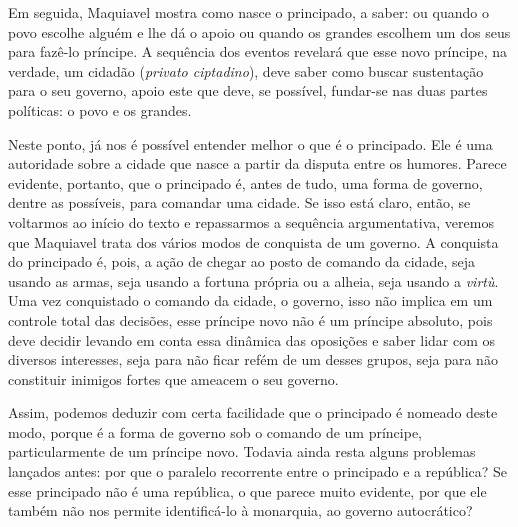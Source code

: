 Em seguida, Maquiavel mostra como nasce o principado, a saber: ou quando
o povo escolhe alguém e lhe dá o apoio ou quando os grandes escolhem um
dos seus para fazê-lo príncipe. A sequência dos eventos revelará que
esse novo príncipe, na verdade, um cidadão (\emph{privato ciptadino}),
deve saber como buscar sustentação para o seu governo, apoio este que
deve, se possível, fundar-se nas duas partes políticas: o povo e os
grandes.

Neste ponto, já nos é possível entender melhor o que é o principado. Ele
é uma autoridade sobre a cidade que nasce a partir da disputa entre os
humores. Parece evidente, portanto, que o principado é, antes de tudo,
uma forma de governo, dentre as possíveis, para comandar uma cidade. Se
isso está claro, então, se voltarmos ao início do texto e repassarmos a
sequência argumentativa, veremos que Maquiavel trata dos vários modos de
conquista de um governo. A conquista do principado é, pois, a ação de
chegar ao posto de comando da cidade, seja usando as armas, seja usando
a fortuna própria ou a alheia, seja usando a \emph{virtù}. Uma vez
conquistado o comando da cidade, o governo, isso não implica em um
controle total das decisões, esse príncipe novo não é um príncipe
absoluto, pois deve decidir levando em conta essa dinâmica das oposições
e saber lidar com os diversos interesses, seja para não ficar refém de
um desses grupos, seja para não constituir inimigos fortes que ameacem o
seu governo.

Assim, podemos deduzir com certa facilidade que o principado é nomeado
deste modo, porque é a forma de governo sob o comando de um príncipe,
particularmente de um príncipe novo. Todavia ainda resta alguns
problemas lançados antes: por que o paralelo recorrente entre o
principado e a república? Se esse principado não é uma república, o que
parece muito evidente, por que ele também não nos permite identificá-lo
à monarquia, ao governo autocrático?

